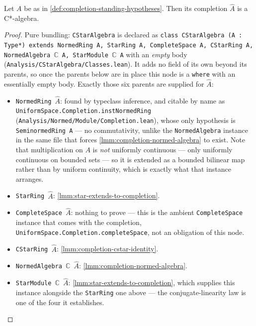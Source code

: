 \begin{lemma}
    \label{lmm:completion-of-cstar-normed-star-algebra}
    \leanok
    Let $A$ be as in \ref{def:completion-standing-hypotheses}. Then its completion $\widehat{A}$ is a C*-algebra.
\end{lemma}
\begin{proof}
    \leanok
    Pure bundling: \texttt{CStarAlgebra} is declared as \texttt{class CStarAlgebra (A : Type*) extends NormedRing A, StarRing A, CompleteSpace A, CStarRing A, NormedAlgebra \ensuremath{\mathbb{C}} A, StarModule \ensuremath{\mathbb{C}} A} with an \emph{empty} body (\texttt{Analysis/CStarAlgebra/Classes.lean}). It adds no field of its own beyond its parents, so once the parents below are in place this node is a \texttt{where} with an essentially empty body. Exactly those six parents are supplied for $\widehat{A}$:
    \begin{itemize}
        \item \texttt{NormedRing \ensuremath{\widehat{A}}}: found by typeclass inference, and citable by name as \texttt{UniformSpace.Completion.instNormedRing} (\texttt{Analysis/Normed/Module/Completion.lean}), whose only hypothesis is \texttt{SeminormedRing A} --- no commutativity, unlike the \texttt{NormedAlgebra} instance in the same file that forces \ref{lmm:completion-normed-algebra} to exist. Note that multiplication on $A$ is \emph{not} uniformly continuous --- only uniformly continuous on bounded sets --- so it is extended as a bounded bilinear map rather than by uniform continuity, which is exactly what that instance arranges.
        \item \texttt{StarRing \ensuremath{\widehat{A}}}: \ref{lmm:star-extends-to-completion}.
        \item \texttt{CompleteSpace \ensuremath{\widehat{A}}}: nothing to prove --- this is the ambient \texttt{CompleteSpace} instance that comes with the completion, \texttt{UniformSpace.Completion.completeSpace}, not an obligation of this node.
        \item \texttt{CStarRing \ensuremath{\widehat{A}}}: \ref{lmm:completion-cstar-identity}.
        \item \texttt{NormedAlgebra \ensuremath{\mathbb{C}} \ensuremath{\widehat{A}}}: \ref{lmm:completion-normed-algebra}.
        \item \texttt{StarModule \ensuremath{\mathbb{C}} \ensuremath{\widehat{A}}}: \ref{lmm:star-extends-to-completion}, which supplies this instance alongside the \texttt{StarRing} one above --- the conjugate-linearity law is one of the four it establishes.
    \end{itemize}
\end{proof}

